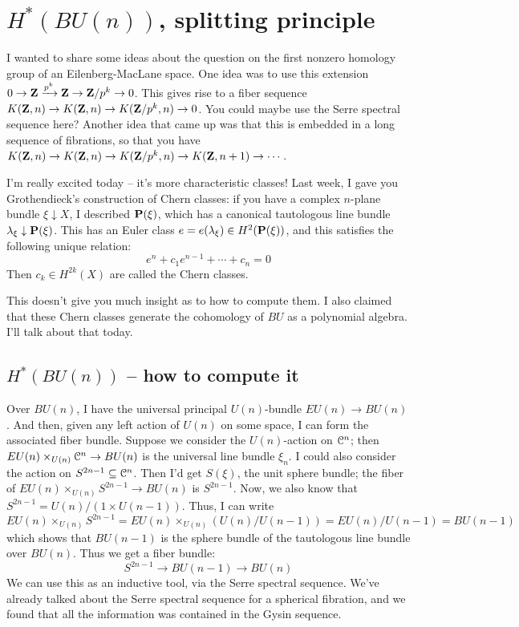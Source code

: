 \section{$H^\ast(BU(n))$, splitting principle}
I wanted to share some ideas about the question on the first nonzero homology group of an Eilenberg-MacLane space.
One idea was to use this extension $0\to \mathbf Z\xrightarrow{{p^k}}\mathbf Z\to \mathbf Z/p^k\to 0$.
This gives rise to a fiber sequence $K(\mathbf Z,n)\to K(\mathbf Z,n)\to K(\mathbf Z/p^k,n)\to 0$.
You could maybe use the Serre spectral sequence here?
Another idea that came up was that this is embedded in a long sequence of fibrations, so that you have $K(\mathbf Z,n)\to K(\mathbf Z,n)\to K(\mathbf Z/p^k, n) \to K(\mathbf Z,n+1)\to\cdots$.

I'm really excited today -- it's more characteristic classes!
Last week, I gave you Grothendieck's construction of Chern classes:
if you have a complex $n$-plane bundle $\xi\downarrow X$, I described $\mathbf P(\xi)$, which has a canonical tautologous line bundle $\lambda_\xi\downarrow \mathbf P(\xi)$.
This has an Euler class $e=e(\lambda_\xi)\in H^2(\mathbf P(\xi))$, and this satisfies the following unique relation:
$$
e^n+c_1e^{n-1} + \cdots + c_n = 0
$$
Then $c_k\in H^{2k}(X)$ are called the Chern classes.

This doesn't give you much insight as to how to compute them.
I also claimed that these Chern classes generate the cohomology of $BU$ as a polynomial algebra.
I'll talk about that today.
\subsection{$H^\ast(BU(n))$ -- how to compute it}
Over $BU(n)$, I have the universal principal $U(n)$-bundle $EU(n)\to BU(n)$.
And then, given any left action of $U(n)$ on some space, I can form the associated fiber bundle.
Suppose we consider the $U(n)$-action on $\mathcal C^n$; then $EU(n)\times_{U(n)}\mathcal C^n\to BU(n)$ is the universal line bundle $\xi_n$.
I could also consider the action on $S^{2n-1}\subseteq \mathcal C^n$.
Then I'd get $S(\xi)$, the unit sphere bundle; the fiber of $EU(n)\times_{U(n)}S^{2n-1}\to BU(n)$ is $S^{2n-1}$.
Now, we also know that $S^{2n-1} = U(n)/(1\times U(n-1))$.
Thus, I can write
$$EU(n)\times_{U(n)}S^{2n-1} = EU(n)\times_{U(n)} (U(n)/U(n-1)) = EU(n)/U(n-1) = BU(n-1)$$
which shows that $BU(n-1)$ is the sphere bundle of the tautologous line bundle over $BU(n)$.
Thus we get a fiber bundle:
$$
S^{2n-1}\to BU(n-1)\to BU(n)
$$
We can use this as an inductive tool, via the Serre spectral sequence.
We've already talked about the Serre spectral sequence for a spherical fibration, and we found that all the information was contained in the Gysin sequence.

